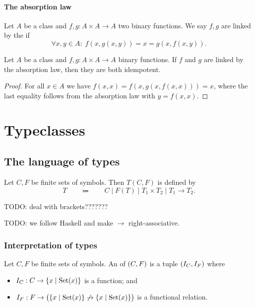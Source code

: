 \subsubsection{The absorption law}
\begin{definition}
Let $A$ be a class and $f,g: A\times A \to A$ two binary functions.
We say $f, g$ are linked by the  if
\[ \forall x,y\in A:\; f(x,g(x,y)) = x = g(x,f(x,y)). \]
\end{definition}

\begin{lemma} \label{absorptionIdempotency}
Let $A$ be a class and $f,g: A\times A\to A$ binary functions. If $f$ and $g$ are linked by the absorption law, then they are both idempotent.
\end{lemma}
\begin{proof}
For all $x\in A$ we have $f(x,x) = f(x,g(x,f(x,x))) = x$, where the last equality follows from the absorption law with $y = f(x,x)$.
\end{proof}

\chapter{Typeclasses}
\section{The language of types}
\begin{definition}
Let $C, F$ be finite sets of symbols. Then  $T(C, F)$ is defined by
\[ T \qquad \Coloneqq \qquad C \;|\; F(T) \;|\; T_1\times T_2 \;|\; T_1\to T_2. \]
\end{definition}
TODO: deal with brackets???????

TODO: we follow Haskell and make $\to$ right-associative.

\subsection{Interpretation of types}
\begin{definition}
Let $C, F$ be finite sets of symbols. An  of $\sSet{C, F}$ is a tuple $\sSet{I_C, I_F}$ where
\begin{itemize}
\item $I_C: C \to \setbuilder{x}{\Set(x)}$ is a function; and
\item $I_F: F \to \big(\setbuilder{x}{\Set(x)} \not\to \setbuilder{x}{\Set(x)}\big)$ is a functional relation.
\end{itemize}
\end{definition}

